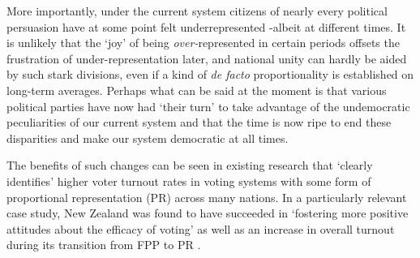 \documentclass[DIV=calc, paper=a4, fontsize=11pt, twocolumn]{scrartcl}	 %
\begin{document}
More importantly, under the current system citizens of nearly every political persuasion have at some point felt underrepresented \--albeit at different times. It is unlikely that the `joy' of being \emph{over-}represented in certain periods offsets the frustration of under-representation later, and
 national unity can hardly be aided by such stark divisions, even if a kind of \emph{ de facto} proportionality is established on long-term averages. 
Perhaps what can be said at the moment is that various political parties have now had `their turn' to take advantage of the undemocratic peculiarities of our current system and that the time is now ripe to end these disparities and make our system democratic at all times. 

The benefits of such changes can be seen in existing research that `clearly identifies' higher voter turnout rates in voting systems with some form of proportional representation (PR) \cite{Blais}
 across many nations. In a particularly relevant case study, New Zealand was found to have succeeded in `fostering more positive attitudes about the efficacy of voting' as well as an increase in overall turnout during its transition from FPP to PR\cite{NZ_PR_results}
 .
\end{document}
